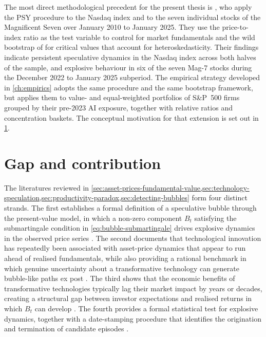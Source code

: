 The most direct methodological precedent for the present thesis is \citet{baselePhillipsShi2025}, who apply the PSY procedure to the Nasdaq index and to the seven individual stocks of the Magnificent Seven over January 2010 to January 2025. They use the price-to-index ratio as the test variable to control for market fundamentals and the wild bootstrap of \citet{harveyEtAl2016} for critical values that account for heteroskedasticity. Their findings indicate persistent speculative dynamics in the Nasdaq index across both halves of the sample, and explosive behaviour in six of the seven Mag-7 stocks during the December 2022 to January 2025 subperiod. The empirical strategy developed in \cref{ch:empirics} adopts the same procedure and the same bootstrap framework, but applies them to value- and equal-weighted portfolios of S\&P~500 firms grouped by their pre-2023 AI exposure, together with relative ratios and concentration baskets. The conceptual motivation for that extension is set out in \cref{sec:bubbles-gap-contribution}.


\section{Gap and contribution}
\label{sec:bubbles-gap-contribution}

The literatures reviewed in \cref{sec:asset-prices-fundamental-value,sec:technology-speculation,sec:productivity-paradox,sec:detecting-bubbles} form four distinct strands. The first establishes a formal definition of a speculative bubble through the present-value model, in which a non-zero component $B_t$ satisfying the submartingale condition in \cref{eq:bubble-submartingale} drives explosive dynamics in the observed price series \citep{phillipsShiYu2015a}. The second documents that technological innovation has repeatedly been associated with asset-price dynamics that appear to run ahead of realised fundamentals, while also providing a rational benchmark in which genuine uncertainty about a transformative technology can generate bubble-like paths ex post \citep{kindlebergerAliber2015,pastorVeronesi2009}. The third shows that the economic benefits of transformative technologies typically lag their market impact by years or decades, creating a structural gap between investor expectations and realised returns in which $B_t$ can develop \citep{brynjolfsson1993,david1990}. The fourth provides a formal statistical test for explosive dynamics, together with a date-stamping procedure that identifies the origination and termination of candidate episodes \citep{phillipsWuYu2011,phillipsShiYu2015a,phillipsShiYu2015b}.

